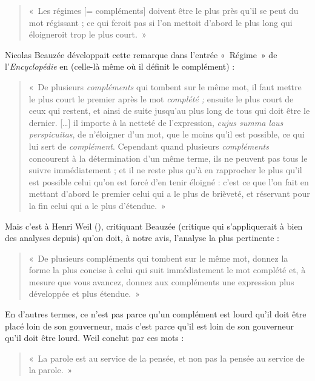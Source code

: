 \begin{quote}
    «~Les régimes [= compléments] doivent être le plus près qu’il se peut du mot régissant ; ce qui feroit pas si l’on mettoit d’abord le plus long qui éloigneroit trop le plus court.~»
\end{quote}
Nicolas Beauzée développait cette remarque dans l’entrée «~Régime~» de l’\textit{Ency\-clo\-pédie} en \citeyear{Beauzée1765} (celle-là même où il définit le complément) :

\begin{quote}
    «~De plusieurs \textit{compléments} qui tombent sur le même mot, il faut mettre le plus court le premier après le mot \textit{complété ;} ensuite le plus court de ceux qui restent, et ainsi de suite jusqu’au plus long de tous qui doit être le dernier. […] il importe à la netteté de l’expression, \textit{cujus summa laus perspicuitas}, de n’éloigner d’un mot, que le moins qu’il est possible, ce qui lui sert de \textit{complément}. Cependant quand plusieurs \textit{compléments} concourent à la détermination d’un même terme, ils ne peuvent pas tous le suivre immédiatement ; et il ne reste plus qu’à en rapprocher le plus qu’il est possible celui qu’on est forcé d’en tenir éloigné : c’est ce que l’on fait en mettant d’abord le premier celui qui a le plus de brièveté, et réservant pour la fin celui qui a le plus d’étendue.~»
\end{quote}
Mais c’est à Henri Weil (\citeyear[97--102]{weil1844de}), critiquant Beauzée (critique qui s’appliquerait à bien des analyses depuis) qu’on doit, à notre avis, l’analyse la plus pertinente :

\begin{quote}
    «~De plusieurs compléments qui tombent sur le même mot, donnez la forme la plus concise à celui qui suit immédiatement le mot complété et, à mesure que vous avancez, donnez aux compléments une expression plus développée et plus étendue.~»
\end{quote}
En d’autres termes, ce n’est pas parce qu’un complément est lourd qu’il doit être placé loin de son gouverneur, mais c’est parce qu’il est loin de son gouverneur qu’il doit être lourd. Weil conclut par ces mots :

\begin{quote}
    «~La parole est au service de la pensée, et non pas la pensée au service de la parole.~»
\end{quote}

